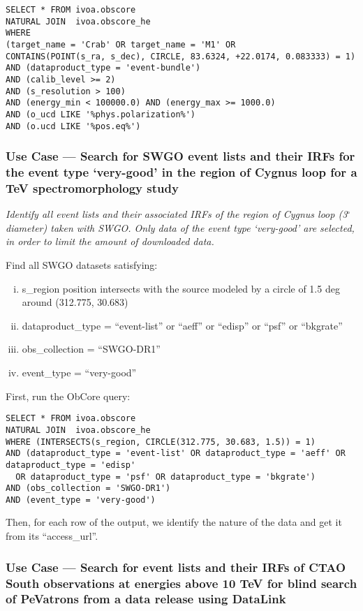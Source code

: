 \begin{verbatim}
SELECT * FROM ivoa.obscore
NATURAL JOIN  ivoa.obscore_he 
WHERE
(target_name = 'Crab' OR target_name = 'M1' OR
CONTAINS(POINT(s_ra, s_dec), CIRCLE, 83.6324, +22.0174, 0.083333) = 1) 
AND (dataproduct_type = 'event-bundle')
AND (calib_level >= 2)
AND (s_resolution > 100)
AND (energy_min < 100000.0) AND (energy_max >= 1000.0)
AND (o_ucd LIKE '%phys.polarization%')
AND (o.ucd LIKE '%pos.eq%')
\end{verbatim}

\subsubsection{Use Case ---  Search for SWGO event lists and their \glspl{IRF} for the event type `very-good' in the region of Cygnus loop for a TeV spectromorphology study}

{\em Identify all event lists and their associated \glspl{IRF} of the region of Cygnus loop (3$^{\circ}$ diameter) taken with SWGO. Only data of the event type `very-good' are selected, in order to limit the amount of downloaded data.\/}

\medskip
\noindent Find all SWGO datasets satisfying:
\begin{enumerate}[(i)]
  \item s\_region position intersects with the source modeled by a circle of 1.5 deg around (312.775, 30.683)
  \item dataproduct\_type = ``event-list'' or ``aeff'' or ``edisp'' or ``psf'' or ``bkgrate''
  \item obs\_collection = ``SWGO-DR1''
  \item event\_type = ``very-good''
\end{enumerate}

First, run the ObCore query:
\begin{verbatim}
SELECT * FROM ivoa.obscore
NATURAL JOIN  ivoa.obscore_he
WHERE (INTERSECTS(s_region, CIRCLE(312.775, 30.683, 1.5)) = 1)
AND (dataproduct_type = 'event-list' OR dataproduct_type = 'aeff' OR dataproduct_type = 'edisp' 
  OR dataproduct_type = 'psf' OR dataproduct_type = 'bkgrate')
AND (obs_collection = 'SWGO-DR1')
AND (event_type = 'very-good')
\end{verbatim}

Then, for each row of the output, we identify the nature of the data and get it from its ``access\_url''.

\subsubsection{Use Case --- Search for event lists and their \glspl{IRF} of CTAO South observations at energies above 10 TeV for blind search of PeVatrons from a data release using DataLink}

